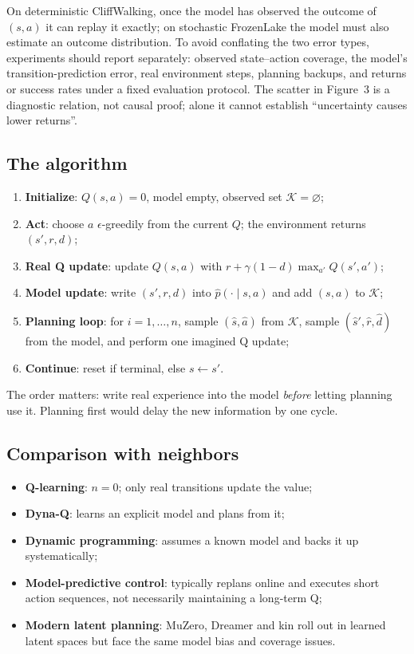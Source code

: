 \documentclass{article}
\begin{document}
On deterministic CliffWalking, once the model has observed the outcome of $(s,a)$ it can replay it exactly; on stochastic FrozenLake the model must also estimate an outcome distribution. To avoid conflating the two error types, experiments should report separately: observed state--action coverage, the model's transition-prediction error, real environment steps, planning backups, and returns or success rates under a fixed evaluation protocol. The scatter in Figure~3 is a diagnostic relation, not causal proof; alone it cannot establish ``uncertainty causes lower returns''.

\subsection*{The algorithm}

\begin{enumerate}
  \item \textbf{Initialize}: $Q(s,a)=0$, model empty, observed set $\mathcal K=\varnothing$;
  \item \textbf{Act}: choose $a$ $\epsilon$-greedily from the current $Q$; the environment returns $(s',r,d)$;
  \item \textbf{Real Q update}: update $Q(s,a)$ with $r+\gamma(1-d)\max_{a'}Q(s',a')$;
  \item \textbf{Model update}: write $(s',r,d)$ into $\hat p(\cdot\mid s,a)$ and add $(s,a)$ to $\mathcal K$;
  \item \textbf{Planning loop}: for $i=1,\ldots,n$, sample $(\hat s,\hat a)$ from $\mathcal K$, sample $(\hat s',\hat r,\hat d)$ from the model, and perform one imagined Q update;
  \item \textbf{Continue}: reset if terminal, else $s\leftarrow s'$.
\end{enumerate}

The order matters: write real experience into the model \emph{before} letting planning use it. Planning first would delay the new information by one cycle.

\subsection*{Comparison with neighbors}

\begin{itemize}
  \item \textbf{Q-learning}: $n=0$; only real transitions update the value;
  \item \textbf{Dyna-Q}: learns an explicit model and plans from it;
  \item \textbf{Dynamic programming}: assumes a known model and backs it up systematically;
  \item \textbf{Model-predictive control}: typically replans online and executes short action sequences, not necessarily maintaining a long-term Q;
  \item \textbf{Modern latent planning}: MuZero, Dreamer and kin roll out in learned latent spaces but face the same model bias and coverage issues.
\end{itemize}
\end{document}
